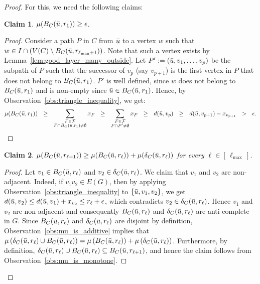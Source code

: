 \documentclass[11pt]{amsart}
\newtheorem{claim}{Claim}[theorem]
\begin{document}
\begin{proof}
    For this, we need the following claims:
    
    \begin{claim}\label{claim:inner_ball_has_non_zero_measure}
        $\mu(B_C(\Bar{u}, r_1)) \geq \epsilon$.
    \end{claim}
    \begin{proof}
        Consider a path $P$ in $C$ from $\Bar{u}$ to a vertex $w$ such that $w \in I\cap (V(C)\setminus B_C(\Bar{u}, r_{\ell_{\max} + 1}))$. Note that such a vertex exists by Lemma~\ref{lem:good_layer_many_outside}. Let $P' := (\Bar{u},v_1,\dots,v_p)$ be the subpath of $P$ such that the successor of $v_p$ (say $v_{p+1}$) is the first vertex in $P$ that does not belong to $B_C(\Bar{u}, r_1)$. $P'$ is well defined, since $w$ does not belong to $B_C(\Bar{u}, r_1)$ and is non-empty since $\Bar{u} \in B_C(\Bar{u}, r_1)$. Hence, by Observation~\ref{obs:triangle_inequality}, we get:
        $$
        \mu(B_C(\Bar{u}, r_1)) 
        \ \ \geq \ \ \sum_{\substack{F \in \mathcal{F} \\ F \cap B_C(\Bar{u}, r_1) \neq \emptyset}} x_F 
        \ \ \geq \ \ \sum_{\substack{F \in \mathcal{F} \\ F \cap P' \neq \emptyset}} x_F 
        \ \ \geq \ \ d(\Bar{u}, v_p) 
        \ \ \geq \ \ d(\Bar{u}, v_{p+1}) - x_{v_{p+1}}
        \ \ > \ \ \epsilon.
        $$ 
    \end{proof}
    
    \begin{claim}\label{claim:meause_of_ball_and_boundary_is_additive}
        $\mu(B_C(\Bar{u}, r_{\ell+1})) \geq \mu(B_C(\Bar{u}, r_\ell)) + \mu(\delta_C(\Bar{u}, r_\ell))$ for every $\ell \in [\,\ell_{\max}\,]$.
    \end{claim}
    \begin{proof}
        Let $v_1 \in B_C(\Bar{u}, r_\ell)$ and $v_2 \in \delta_C(\Bar{u}, r_\ell)$. We claim that $v_1$ and $v_2$ are non-adjacent. Indeed, if $v_1v_2\in E(G)$, then by applying Observation~\ref{obs:triangle_inequality} to $\{\Bar{u},v_1,v_2\}$, we get $d(\Bar{u}, v_2) \leq d(\Bar{u}, v_1) + x_{v_2} \leq r_\ell + \epsilon$, which contradicts $v_2\in \delta_C(\Bar{u}, r_\ell)$. Hence $v_1$ and $v_2$ are non-adjacent and consequently $B_C(\Bar{u}, r_\ell)$ and $\delta_C(\Bar{u}, r_\ell)$ are anti-complete in $G$. Since $B_C(\Bar{u}, r_\ell)$ and $\delta_C(\Bar{u}, r_\ell)$ are disjoint by definition, Observation~\ref{obs:mu_is_additive} implies that $\mu\left(\delta_C(\Bar{u}, r_\ell) \cup B_C(\Bar{u}, r_\ell)\right) = \mu\left(B_C(\Bar{u}, r_\ell)\right) + \mu\left(\delta_C(\Bar{u}, r_\ell)\right)$. Furthermore, by definition, $\delta_C(\Bar{u}, r_\ell) \cup B_C(\Bar{u}, r_\ell) \subseteq B_C(\Bar{u}, r_{\ell+1})$, and hence the claim follows from Observation~\ref{obs:mu_is_monotone}.
    \end{proof}


\end{proof}
\end{document}
